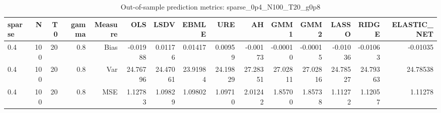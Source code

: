 \begin{table}[!htbp]\centering
\caption{Out-of-sample prediction metrics: sparse_0p4_N100_T20_g0p8}
\label{tab:table3_sparse_0p4_N100_T20_g0p8}
\begin{tabular}{lrrrrrrrrrrrrrr}
\hline
sparse & N & T0 & gamma & Measure & OLS & LSDV & EBMLE & URE & AH & GMM1 & GMM2 & LASSO & RIDGE & ELASTIC_NET \\
\hline
0.4 & 100 & 20 & 0.8 & Bias & -0.01988 & 0.01176 & 0.01417 & 0.00959 & -0.00173 & -0.00010 & -0.00015 & -0.01036 & -0.01063 & -0.01035 \\
0.4 & 100 & 20 & 0.8 & Var & 24.76796 & 24.47061 & 23.91984 & 24.19829 & 27.28351 & 27.02811 & 27.02816 & 24.78527 & 24.79363 & 24.78538 \\
0.4 & 100 & 20 & 0.8 & MSE & 1.12783 & 1.09829 & 1.09802 & 1.09710 & 2.01242 & 1.85700 & 1.85738 & 1.11272 & 1.12057 & 1.11278 \\
\hline
\end{tabular}
\end{table}

